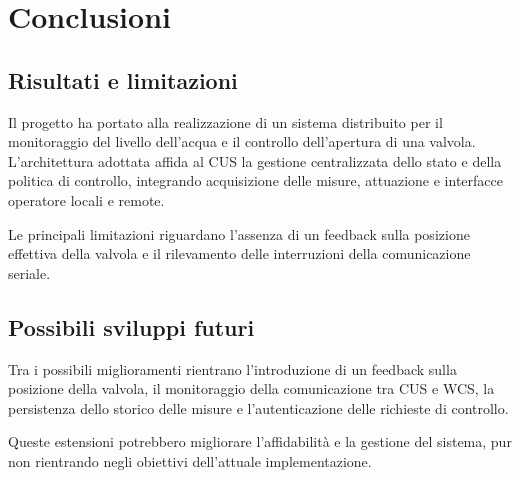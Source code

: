 
\section{Conclusioni}%
\label{sec:conclusions}

\subsection{Risultati e limitazioni}

Il progetto ha portato alla realizzazione di un sistema distribuito per il monitoraggio del livello dell'acqua e il controllo dell'apertura di una valvola.
L'architettura adottata affida al CUS la gestione centralizzata dello stato e della politica di controllo, integrando acquisizione delle misure, attuazione e interfacce operatore locali e remote.

Le principali limitazioni riguardano l'assenza di un feedback sulla posizione effettiva della valvola e il rilevamento delle interruzioni della comunicazione seriale.

\subsection{Possibili sviluppi futuri}

Tra i possibili miglioramenti rientrano l'introduzione di un feedback sulla posizione della valvola, il monitoraggio della comunicazione tra CUS e WCS, la persistenza dello storico delle misure e l'autenticazione delle richieste di controllo.

Queste estensioni potrebbero migliorare l'affidabilità e la gestione del sistema, pur non rientrando negli obiettivi dell'attuale implementazione.
